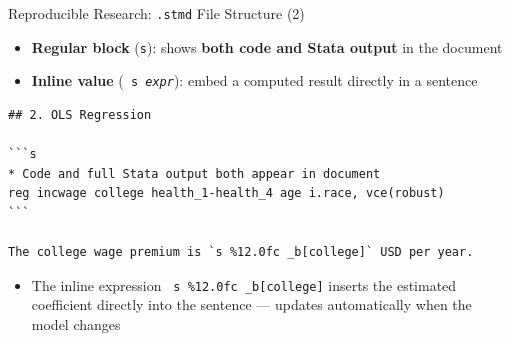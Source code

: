 \documentclass[dvipsnames,hyperref={pdfpagelabels=false}]{beamer}
\begin{document}
\begin{frame}[fragile]{Reproducible Research: \texttt{.stmd} File Structure (2)}

	\begin{itemize}
		\item \textbf{Regular block} (\texttt{{\char96}{}{}s}): shows \textbf{both code and Stata output} in the document
		\vspace{0.2cm}
		\item \textbf{Inline value} (\texttt{{} s \textit{expr}{}}): embed a computed result directly in a sentence
	\end{itemize}

\begin{lstlisting}[language={},basicstyle=\ttfamily\fontsize{7.5}{9}\selectfont,keywordstyle={},breaklines=true,breakatwhitespace=true]
## 2. OLS Regression

```s
* Code and full Stata output both appear in document
reg incwage college health_1-health_4 age i.race, vce(robust)
```

The college wage premium is `s %12.0fc _b[college]` USD per year.
\end{lstlisting}

	\begin{itemize}
		\item The inline expression \texttt{{} s \%12.0fc \_b[college]{}} inserts the estimated coefficient directly into the sentence --- updates automatically when the model changes
	\end{itemize}

\end{frame}
\end{document}
